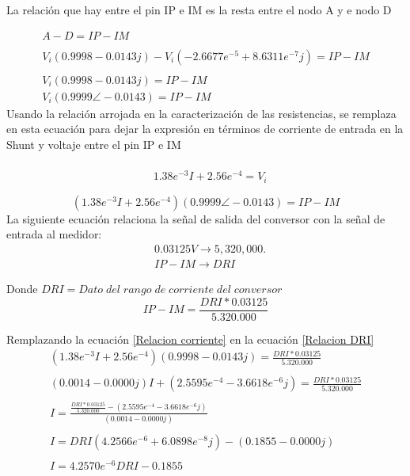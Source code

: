     La relación que hay entre el pin IP e IM es la resta entre el nodo A y e nodo D
    
    \begin{align*}
        A-D = IP-IM\\\\
        V_{i}(0.9998 - 0.0143j) - V_{i} (-2.6677e^{-5} + 8.6311e^{-7}j) = IP-IM\\\\
        V_{i}(0.9998 - 0.0143j) = IP-IM \\
        V_{i} (0.9999 \angle -0.0143) =  IP-IM
    \end{align*}
    Usando la relación arrojada en la caracterización de las resistencias, se remplaza en esta ecuación para dejar la expresión en términos de corriente de entrada en la Shunt y voltaje entre el pin IP e IM\\\\
    \begin{align*}
        &1.38e^{-3} I + 2.56e^{-4} = V_{i}\\\\
    \end{align*}
    \begin{equation}\label{Relacion corriente}
        (1.38e^{-3} I + 2.56e^{-4})(0.9999 \angle -0.0143)  = IP-IM
    \end{equation}
    La siguiente ecuación relaciona la señal de salida del conversor con la señal de entrada al medidor:\\

    \begin{align*}
        &0.03125V \rightarrow 5,320,000.\\
        &IP-IM \rightarrow DRI
    \end{align*}
    
    Donde $DRI = Dato\;del\;rango\;de\;corriente\;del\;conversor$\\
    
    \begin{equation}\label{Relacion DRI}
        IP-IM = \frac{DRI * 0.03125}{5.320.000}
    \end{equation}
    
    Remplazando la ecuación \ref{Relacion corriente} en la ecuación \ref{Relacion DRI}
    \begin{align*}
        (1.38e^{-3} I + 2.56e^{-4})(0.9998 - 0.0143j) = \frac{DRI * 0.03125}{5.320.000} \\\\
        (0.0014 - 0.0000j)I + (2.5595e^{-4} - 3.6618e^{-6}j)  = \frac{DRI * 0.03125}{5.320.000} \\\\
        I = \frac{\frac{DRI * 0.03125}{5.320.000} - (2.5595e^{-4} - 3.6618e^{-6}j)}{(0.0014 - 0.0000j)}  \\\\
        I = DRI (4.2566e^{-6} + 6.0898e^{-8}j) - (0.1855 - 0.0000j)   \\\\
        I = 4.2570e^{-6}DRI  - 0.1855   \\\\
    \end{align*}


